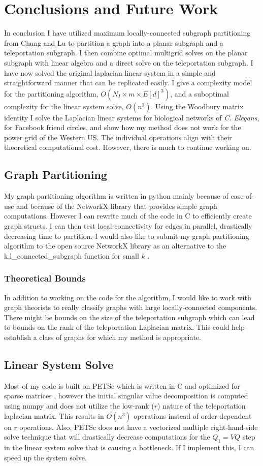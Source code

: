 \documentclass{article}
\begin{document}
\section{Conclusions and Future Work}
In conclusion I have utilized maximum locally-connected subgraph partitioning from Chung and Lu to partition a graph into a planar subgraph and a teleportation subgraph. I then combine optimal multigrid solves on the planar subgraph with linear algebra and a direct solve on the teleportation subgraph. I have now solved the original laplacian linear system in a simple and straightforward manner that can be replicated easily. I give a complexity model for the partitioning algorithm, $O(N_I \times m \times E[d]^3)$, and a suboptimal complexity for the linear system solve, $O(n^3)$. Using the Woodbury matrix identity \cite{Woodbury:1950} I solve the Laplacian linear systems for biological networks of \textit{C. Elegans}, for Facebook friend circles, and show how my method does not work for the power grid of the Western US. The individual operations align with their theoretical computational cost. However, there is much to continue working on.

\subsection{Graph Partitioning}
My graph partitioning algorithm is written in python mainly because of ease-of-use and because of the NetworkX library that provides simple graph computations. However I can rewrite much of the code in C to efficiently create graph structs. I can then test local-connectivity for edges in parallel, drastically decreasing time to partition. I would also like to submit my graph partitioning algorithm to the open source NetworkX library as an alternative to the k,l\_connected\_subgraph function for small $k$ \cite{Hagberg:2008}.
\subsubsection{Theoretical Bounds}
In addition to working on the code for the algorithm, I would like to work with graph theorists to really classify graphs with large locally-connected components. There might be bounds on the size of the teleportation subgraph which can lead to bounds on the rank of the teleportation Laplacian matrix. This could help establish a class of graphs for which my method is appropriate.

\subsection{Linear System Solve}
Most of my code is built on PETSc which is written in C and optimized for sparse matrices \cite{petsc-user-ref}, however the initial singular value decomposition is computed using numpy \cite{numpy} and does not utilize the low-rank ($r$) nature of the teleportation laplacian matrix. This results in $O(n^3)$ operations instead of order dependent on $r$ operations. Also, PETSc does not have a vectorized multiple right-hand-side solve technique that will drastically decrease computations for the $Q_1 = VQ$ step in the linear system solve that is causing a bottleneck. If I implement this, I can speed up the system solve.
\end{document}
